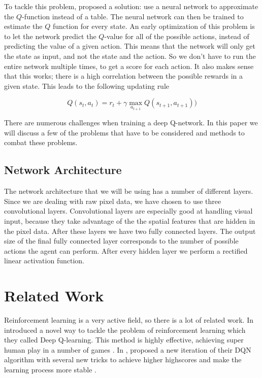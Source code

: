 \documentclass{article}
\begin{document}
To tackle this problem, \citeauthor{mnih2013playing} proposed a solution: use a neural network to approximate the $Q$-function instead of a table. The neural network can then be trained to estimate the $Q$ function for every state. 
An early optimization of this problem is to let the network predict the $Q$-value for all of the possible actions, instead of predicting the value of a given action. This means that the network will only get the state as input, and not the state and the action. So we don't have to run the entire network multiple times, to get a score for each action. It also makes sense that this works; there is a high correlation between the possible rewards in a given state. This leads to the following updating rule

\[
    Q(s_t,a_t) = r_t + \gamma \max_{a_{t+1}} Q(s_{t+1},a_{t+1}))
\]

There are numerous challenges when training a deep Q-network. In this paper we will discuss a few of the problems that have to be considered and methods to combat these problems.

\subsection{Network Architecture}

The network architecture that we will be using has a number of different layers. Since we are dealing with raw pixel data, we have chosen to use three convolutional layers. Convolutional layers are especially good at handling visual input, because they take advantage of the the spatial features that are hidden in the pixel data. After these layers we have two fully connected layers. The output size of the final fully connected layer corresponds to the number of possible actions the agent can perform. After every hidden layer we perform a rectified linear activation function.



\section{Related Work}

Reinforcement learning is a very active field, so there is a lot of related work. In \citeyear{mnih2013playing} \citeauthor{mnih2013playing} introduced a novel way to tackle the problem of reinforcement learning which they called Deep Q-learning. This method is highly effective, achieving super human play in a number of games \cite{mnih2013playing}. In \citeyear{mnih2015human}, \citeauthor{mnih2013playing} proposed a new iteration of their DQN algorithm with several new tricks to achieve higher highscores and make the learning process more stable \cite{mnih2015human}.
\end{document}
